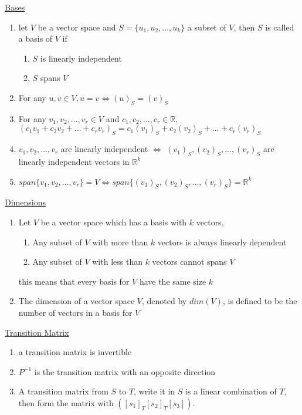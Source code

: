 \documentclass[a4paper,1pt,landscape]{article}
\begin{document}
\begin{multicols}{3}
\underline{Bases}
\begin{enumerate}
\item let $V$ be a vector space and $S = \{ u_1, u_2, ..., u_k \}$ a subset of $V$, then $S$ is called a basis of $V$ if 
\begin{enumerate}
    \item $S$ is linearly independent
    \item $S$ spans $V$
\end{enumerate}
\item For any $u, v \in V, u = v \Leftrightarrow (u)_S = (v)_S$
\item For any $v_1, v_2, ..., v_r \in V$ and $c_1, c_2, ..., c_r \in \mathbb{R}$,\\$(c_1v_1 + c_2v_2 + ... + c_rv_r)_S = c_1(v_1)_S + c_2(v_2)_S + ... + c_r(v_r)_S$
\item $ v_1, v_2, ..., v_r $ are linearly independent $\Leftrightarrow
$ $ (v_1)_S, (v_2)_S, ..., (v_r)_S $ are linearly independent vectors in $ \mathbb{R}^k $ 
\item $span\{v_1, v_2, ..., v_r\} = V \Leftrightarrow span\{(v_1)_S, (v_2)_S, ..., (v_r)_S\} = \mathbb{R}^k$
\end{enumerate}

\underline{Dimensions}
\begin{enumerate}
\item Let $V$ be a vector space which has a basis with $k$ vectors,
\begin{enumerate}
    \item Any subset of $V$ with more than $k$ vectors is always linearly dependent
    \item Any subset of $V$ with less than $k$ vectors cannot spans $V$
\end{enumerate} this means that every basis for $V$ have the same size $k$
\item The dimension of a vector space $V$, denoted by $dim(V)$, is defined to be the number of vectors in a basis for $V$
\end{enumerate}

\underline{Transition Matrix}
\begin{enumerate}
\item a transition matrix is invertible
\item $P^{-1}$ is the transition matrix with an opposite direction
\item A transition matrix from $S$ to $T$, write it in $S$ is a linear combination of $T$, then form the matrix with $([s_1]_T  [s_2]_T  [s_3])$.
\end{enumerate}


\end{multicols}
\end{document}
